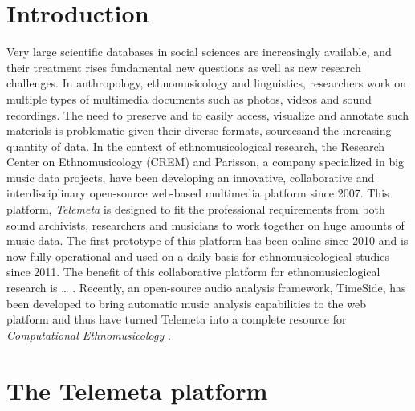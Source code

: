 \documentclass{sig-alternate}
\begin{document}
\section{Introduction}\label{sec:intro}
 Very large scientific databases in social sciences are increasingly available, and their treatment rises fundamental new questions as well as new research challenges. 
In anthropology, ethnomusicology and linguistics, researchers work on multiple types of multimedia documents such as photos, videos and sound recordings. The need to preserve and to easily access, visualize and annotate such materials is problematic given their diverse formats, sourcesand the increasing quantity of data.
 In the context of ethnomusicological research, the Research Center on Ethnomusicology (CREM) and Parisson, a company specialized in big music data projects, have been developing an innovative, collaborative and interdisciplinary open-source web-based multimedia platform since 2007. 
 This platform, \emph{Telemeta} is designed to fit the professional requirements from both sound archivists, researchers and musicians to work together on huge amounts of music data. The first prototype of this platform has been online since 2010 and is now fully operational and used on a daily basis for ethnomusicological studies since 2011. 
The benefit of this collaborative platform for ethnomusicological research is …  \cite{Simmonot_IASA_2011, Julien_IASA_2011, Simonnot_ICTM_2014}.
Recently, an open-source audio analysis framework, TimeSide, has been developed to bring automatic music analysis capabilities to the web platform and thus have turned Telemeta into a complete resource for \emph{Computational Ethnomusicology} \cite{Tzanetakis_2007_JIMS, Gomez_JNMR_2013}.
 \section{The Telemeta platform}\label{sec:Telemeta}
\end{document}
